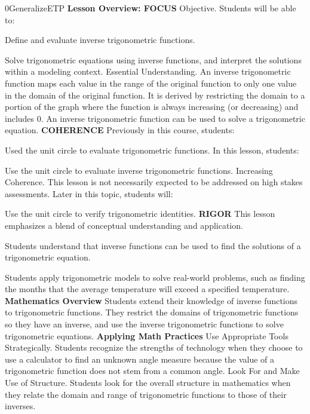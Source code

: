 \documentclass{article}
\newenvironment{te-addendum}[2]{}{}     %
\newcommand{\te}[1]{}                   %
\begin{document}
\begin{te-addendum}{0}{GeneralizeETP}
\textbf{Lesson Overview: FOCUS}
Objective. Students will be able to:
\item Define and evaluate inverse trigonometric functions.
\item Solve trigonometric equations using inverse functions, and interpret the solutions within a modeling context.
Essential Understanding. An inverse trigonometric function maps each value in the range of the original function to only one value in the domain of the original function. It is derived by restricting the domain to a portion of the graph where the function is always increasing (or decreasing) and includes 0. An inverse trigonometric function can be used to solve a trigonometric equation.
\textbf{COHERENCE}
Previously in this course, students:
\item Used the unit circle to evaluate trigonometric functions.
In this lesson, students:
\item Use the unit circle to evaluate inverse trigonometric functions.
Increasing Coherence. This lesson is not necessarily expected to be addressed on high stakes assessments.
Later in this topic, students will:
\item Use the unit circle to verify trigonometric identities.
\textbf{RIGOR}
This lesson emphasizes a blend of conceptual understanding and application.
\item Students understand that inverse functions can be used to find the solutions of a trigonometric equation.
\item Students apply trigonometric models to solve real-world problems, such as finding the months that the average temperature will exceed a specified temperature.
\textbf{Mathematics Overview}
Students extend their knowledge of inverse functions to trigonometric functions. They restrict the domains of trigonometric functions so they have an inverse, and use the inverse trigonometric functions to solve trigonometric equations.
\textbf{Applying Math Practices}
Use Appropriate Tools Strategically. Students recognize the strengths of technology when they choose to use a calculator to find an unknown angle measure because the value of a trigonometric function does not stem from a common angle.
Look For and Make Use of Structure. Students look for the overall structure in mathematics when they relate the domain and range of trigonometric functions to those of their inverses.
\te{SavvasRealize.com. Program Resources.}
\end{te-addendum}
\end{document}
